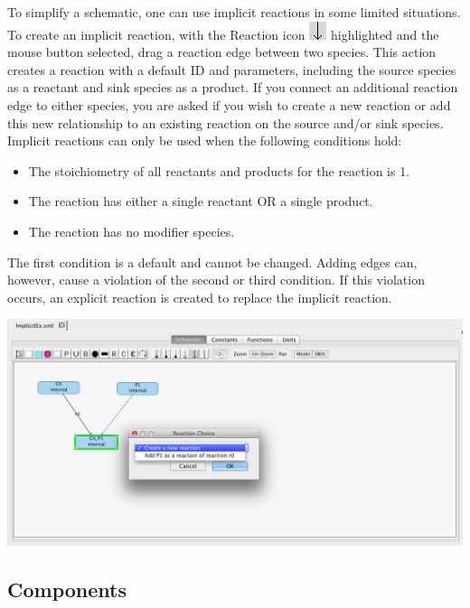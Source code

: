 \documentclass[titlepage,11pt]{article}
\begin{document}
To simplify a schematic, one can use implicit reactions in some limited situations.  To create an implicit reaction, with the Reaction icon \includegraphics{../gui/icons/modelview/reaction_selected} highlighted and the mouse button selected, drag a reaction edge between two species.  This action creates a reaction with a default ID and parameters, including the source species as a reactant and sink species as a product.  If you connect an additional reaction edge to either species, you are asked if you wish to create a new reaction or add this new relationship to an existing reaction on the source and/or sink species.  Implicit reactions can only be used when the following conditions hold:
\begin{itemize}
\item The stoichiometry of all reactants and products for the reaction is 1.
\item The reaction has either a single reactant OR a single product.
\item The reaction has no modifier species.
\end{itemize}
The first condition is a default and cannot be changed.  Adding edges can, however, cause a violation of the second or third condition.  If this violation occurs, an explicit reaction is created to replace the implicit reaction.

\begin{center}
\includegraphics[width=160mm]{screenshots/implicitReactions} 
\end{center}

\subsection{\label{Components}Components}
\end{document}
